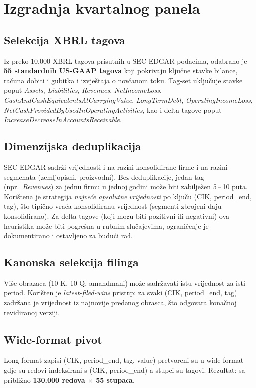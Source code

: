 \documentclass[diplomskirad,authoryear]{fer}
\begin{document}
\section{Izgradnja kvartalnog panela}

\subsection{Selekcija XBRL tagova}
Iz preko 10.000 XBRL tagova prisutnih u SEC EDGAR podacima, odabrano je \textbf{55 standardnih US-GAAP tagova} koji pokrivaju ključne stavke bilance, računa dobiti i gubitka i izvještaja o novčanom toku. Tag-set uključuje stavke poput \emph{Assets}, \emph{Liabilities}, \emph{Revenues}, \emph{NetIncomeLoss}, \emph{CashAndCashEquivalentsAtCarryingValue}, \emph{LongTermDebt}, \emph{OperatingIncomeLoss}, \emph{NetCashProvidedByUsedInOperatingActivities}, kao i delta tagove poput \emph{IncreaseDecreaseInAccountsReceivable}.

\subsection{Dimenzijska deduplikacija}
SEC EDGAR sadrži vrijednosti i na razini konsolidirane firme i na razini segmenata (zemljopisni, proizvodni). Bez deduplikacije, jedan tag (npr.\ \emph{Revenues}) za jednu firmu u jednoj godini može biti zabilježen 5\,--\,10 puta. Korištena je strategija \emph{najveće apsolutne vrijednosti} po ključu (CIK, period\_end, tag), što tipično vraća konsolidiranu vrijednost (segmenti zbrojeni daju konsolidirano). Za delta tagove (koji mogu biti pozitivni ili negativni) ova heuristika može biti pogrešna u rubnim slučajevima, ograničenje je dokumentirano i ostavljeno za budući rad.

\subsection{Kanonska selekcija filinga}
Više obrazaca (10-K, 10-Q, amandmani) može sadržavati istu vrijednost za isti period. Korišten je \emph{latest-filed-wins} pristup: za svaki (CIK, period\_end, tag) zadržana je vrijednost iz najnovije predanog obrasca, što odgovara konačnoj revidiranoj verziji.

\subsection{Wide-format pivot}
Long-format zapisi (CIK, period\_end, tag, value) pretvoreni su u wide-format gdje su redovi indeksirani s (CIK, period\_end) a stupci su tagovi. Rezultat: sa približno \textbf{130.000 redova $\times$ 55 stupaca}.
\end{document}

